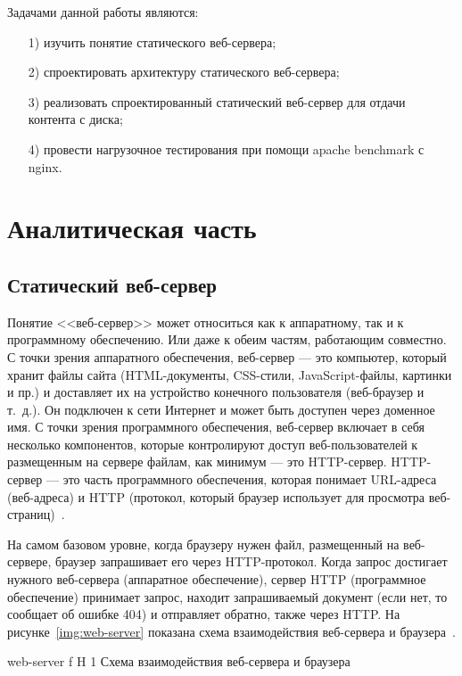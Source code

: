 \documentclass{bmstu}
\begin{document}
Задачами данной работы являются:
\begin{enumerate}
\item[1)] изучить понятие статического веб-сервера;
\item[2)] спроектировать архитектуру статического веб-сервера;
\item[3)] реализовать спроектированный статический веб-сервер для отдачи контента с диска;
\item[4)] провести нагрузочное тестирования при помощи apache benchmark с nginx.
\end{enumerate}

\chapter{Аналитическая часть}

\section{Статический веб-сервер}

Понятие <<веб-сервер>> может относиться как к аппаратному, так и к программному обеспечению. 
Или даже к обеим частям, работающим совместно. 
С точки зрения аппаратного обеспечения, веб-сервер --- это компьютер, который хранит файлы сайта (HTML-документы, CSS-стили, JavaScript-файлы, картинки и пр.) и доставляет их на устройство конечного пользователя (веб-браузер и т.~д.). 
Он подключен к сети Интернет и может быть доступен через доменное имя. 
С точки зрения программного обеспечения, веб-сервер включает в себя несколько компонентов, которые контролируют доступ веб-пользователей к размещенным на сервере файлам, как минимум --- это HTTP-сервер. 
HTTP-сервер — это часть программного обеспечения, которая понимает URL-адреса (веб-адреса) и HTTP (протокол, который браузер использует для просмотра веб-страниц)~\cite{MdnWebServer2023}.

На самом базовом уровне, когда браузеру нужен файл, размещенный на веб-сервере, браузер запрашивает его через HTTP-протокол. 
Когда запрос достигает нужного веб-сервера (аппаратное обеспечение), сервер HTTP (программное обеспечение) принимает запрос, находит запрашиваемый документ (если нет, то сообщает об ошибке 404) и отправляет обратно, также через HTTP. 
На рисунке~\ref{img:web-server} показана схема взаимодействия веб-сервера и браузера~\cite{MdnWebServer2023}.

    {web-server}
    {f}
    {H}
    {1\textwidth}
    {Схема взаимодействия веб-сервера и браузера~\cite{MdnWebServer2023}}
\end{document}

